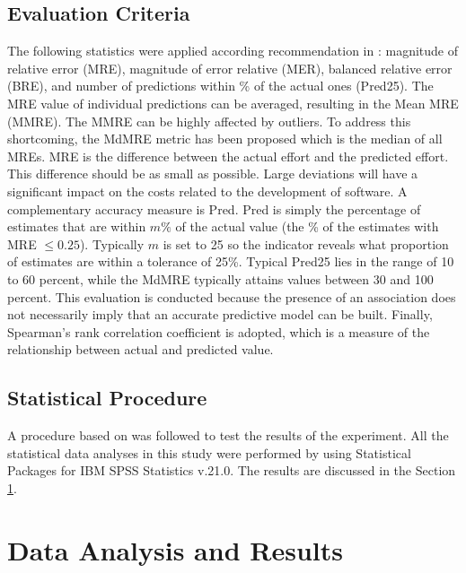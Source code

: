 \documentclass[conference]{IEEEtran}
\begin{document}
\subsection{Evaluation Criteria} \label{sec:EvaluationCriteria}
The following statistics were applied according recommendation in \cite{dejaeger:2012}: magnitude of relative error (MRE), magnitude of error relative (MER), balanced relative error (BRE), and number of predictions within \% of the actual ones (Pred25). The MRE value of individual predictions can be averaged, resulting in the Mean MRE (MMRE). The MMRE can be highly affected by outliers. To address this shortcoming, the MdMRE metric has been proposed which is the median of all MREs. MRE is the difference between the actual effort and the predicted effort. This difference should be as small as possible. Large deviations will have a significant impact on the costs related to the development of software. A complementary accuracy measure is Pred. Pred is simply the percentage of estimates that are within $m\%$ of the actual value (the \% of the estimates with MRE $\leq0.25$). Typically $m$ is set to 25 so the indicator reveals what proportion of estimates are within a tolerance of 25\%. Typical Pred25 lies in the range of 10 to 60 percent, while the MdMRE typically attains values between 30 and 100 percent. This evaluation is conducted because the presence of an association does not necessarily imply that an accurate predictive model can be built. Finally, Spearman's rank correlation coefficient is adopted, which is a measure of the relationship between actual and predicted value.

\subsection{Statistical Procedure}

A procedure based on \cite{dejaeger:2012} \cite{Lavazza:2013} \cite{QuesadaLopez:2016} \cite{MurilloMorera:2016} \cite{QuesadaLopez:2015} \cite{QuesadaLopez:2014} was followed to test the results of the experiment. All the statistical data analyses in this study were performed by using Statistical Packages for IBM SPSS Statistics v.21.0. The results are discussed in the Section \ref{sec:AnalysisInterpretationResults}.

\section{Data Analysis and Results} \label{sec:AnalysisInterpretationResults}
\end{document}
